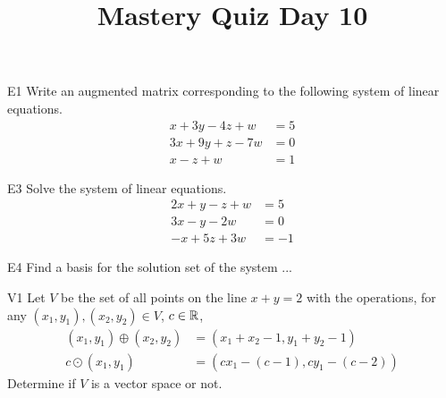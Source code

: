 \documentclass{sbgLAquiz}
\title{Mastery Quiz Day 10 }
\begin{document}
\begin{problem}{E1}
Write an augmented matrix corresponding to the following system of linear equations.
\begin{align*}
x+3y-4z +w &= 5 \\
3x+9y+z-7w &= 0 \\
x-z +w &= 1
\end{align*}
\end{problem}

\begin{problem}{E3}
Solve the system of linear equations.
\begin{align*}
2x+y-z+w &=5 \\
3x-y-2w &= 0 \\
-x+5z+3w&=-1
\end{align*}
\end{problem}
\newpage

\begin{problem}{E4}
Find a basis for the solution set of the system ...
\end{problem}

\begin{problem}{V1}
Let $V$ be the set of all points on the line $x+y=2$ with the operations, for any $(x_1,y_1), (x_2,y_2) \in V$, $c \in \mathbb{R}$,
\begin{align*}
(x_1,y_1) \oplus (x_2,y_2) &= (x_1+x_2-1,y_1+y_2-1) \\
c \odot (x_1,y_1) &= (cx_1-(c-1), cy_1-(c-2))
\end{align*}
Determine if $V$ is a vector space or not.
\end{problem}
\end{document}

